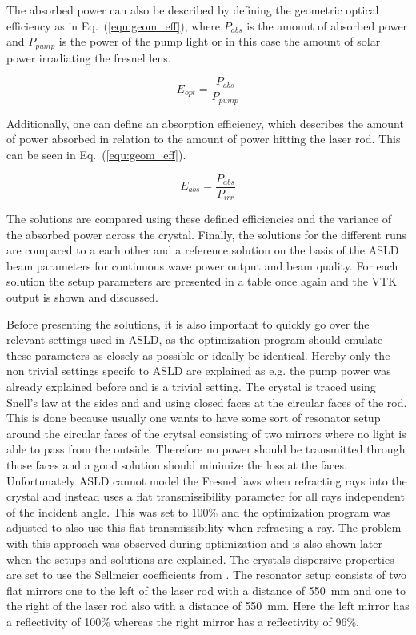 \documentclass[a4paper,10pt]{article}
\newcommand{\equref}[1]{Eq.~(\ref{#1})}
\begin{document}
    The absorbed power can also be described by defining the geometric
    optical efficiency as in \equref{equ:geom_eff}, where
    $P_{abs}$ is the amount of absorbed power and $P_{pump}$ is
    the power of the pump light or in this case the amount of
    solar power irradiating the fresnel lens.

    \begin{equation}
        \label{equ:geom_eff}
        E_{opt} = \frac{P_{abs}}{P_{pump}}
    \end{equation}

    Additionally, one can define an absorption efficiency, which
    describes the amount of power absorbed in relation to the
    amount of power hitting the laser rod. 
    This can be seen in \equref{equ:geom_eff}.

    \begin{equation}
        \label{equ:geom_eff}
        E_{abs} = \frac{P_{abs}}{P_{irr}}
    \end{equation}


    The solutions are compared using these defined efficiencies and
    the variance of the absorbed power across the crystal.
    Finally, the solutions for the different runs are compared to a
    each other and a 
    reference solution on the basis of the ASLD beam parameters
    for continuous wave power output and beam quality.
    For each solution the setup parameters are presented in a table
    once again and the VTK output is shown and discussed.

    Before presenting the solutions, it is also important to quickly go
    over the relevant settings used
    in ASLD, as the optimization program should emulate these parameters
    as closely as possible or ideally be identical.
    Hereby only the non trivial settings specifc to ASLD are explained 
    as e.g. the pump power was already explained before and is a trivial
    setting.
    The crystal is traced using Snell's law at the sides and
    and using closed faces at the circular faces of the rod.
    This is done because usually one wants to have some sort of resonator
    setup around the circular faces of the crytsal consisting of 
    two mirrors where no light is able to pass from the outside.
    Therefore no power should be transmitted through those faces
    and a good solution should minimize the loss at the faces.
    Unfortunately ASLD cannot model the Fresnel laws when refracting
    rays into the crystal and instead uses a flat transmissibility 
    parameter for all rays independent of the incident angle.
    This was set to 100\% and the optimization program was adjusted
    to also use this flat transmissibility when refracting a ray.
    The problem with this approach was observed during optimization
    and is also shown later when the setups and solutions are explained.
    The crystals dispersive properties are set to use the Sellmeier
    coefficients from \cite{sellmeier_ndyag}.
    The resonator setup consists of two flat mirrors one to the left of
    the laser rod with a distance of \SI{550}{mm} and one to the right
    of the laser rod also with a distance of \SI{550}{mm}.
    Here the left mirror has a reflectivity of 100\% whereas
    the right mirror has a reflectivity of 96\%.
\end{document}
